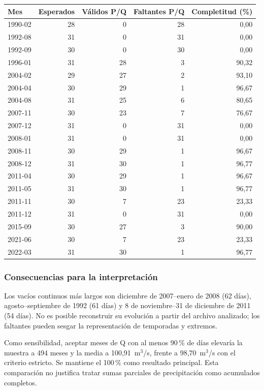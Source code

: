 \documentclass[10pt,a4paper]{article}
\begin{document}
\begin{center}
\small
\begin{center}
\begin{tabular}{lrrrr}
\hline
Mes & Esperados & Válidos P/Q & Faltantes P/Q & Completitud (\%) \\
\hline
1990-02 & 28 & 0 & 28 & 0,00 \\
1992-08 & 31 & 0 & 31 & 0,00 \\
1992-09 & 30 & 0 & 30 & 0,00 \\
1996-01 & 31 & 28 & 3 & 90,32 \\
2004-02 & 29 & 27 & 2 & 93,10 \\
2004-04 & 30 & 29 & 1 & 96,67 \\
2004-08 & 31 & 25 & 6 & 80,65 \\
2007-11 & 30 & 23 & 7 & 76,67 \\
2007-12 & 31 & 0 & 31 & 0,00 \\
2008-01 & 31 & 0 & 31 & 0,00 \\
2008-11 & 30 & 29 & 1 & 96,67 \\
2008-12 & 31 & 30 & 1 & 96,77 \\
2011-04 & 30 & 29 & 1 & 96,67 \\
2011-05 & 31 & 30 & 1 & 96,77 \\
2011-11 & 30 & 7 & 23 & 23,33 \\
2011-12 & 31 & 0 & 31 & 0,00 \\
2015-09 & 30 & 27 & 3 & 90,00 \\
2021-06 & 30 & 7 & 23 & 23,33 \\
2022-03 & 31 & 30 & 1 & 96,77 \\
\hline
\end{tabular}
\end{center}
\end{center}

\subsubsection*{Consecuencias para la interpretación}
Los vacíos continuos más largos son diciembre de 2007--enero de 2008 (62 días),
agosto--septiembre de 1992 (61 días) y 8 de noviembre--31 de diciembre de 2011
(54 días). No es posible reconstruir su evolución a partir del archivo analizado;
los faltantes pueden sesgar la representación de temporadas y extremos.

Como sensibilidad, aceptar meses de Q con al menos 90\,\% de días elevaría la
muestra a 494 meses y la media a 100,91~m$^3$/s, frente a 98,70~m$^3$/s con el
criterio estricto. Se mantiene el 100\,\% como resultado principal. Esta comparación
no justifica tratar sumas parciales de precipitación como acumulados completos.
\end{document}
